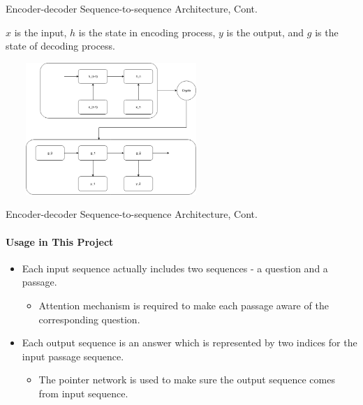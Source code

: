\documentclass{beamer}
\begin{document}
\begin{frame}{Encoder-decoder Sequence-to-sequence Architecture, Cont.}
\begin{examples}
$x$ is the input, $h$ is the state in encoding process, $y$ is the output, and $g$ is the state of decoding process.
\begin{center}
        \includegraphics[width=8cm, height=5cm]{figures/encoderDecoder.png}
    \end{center}
\end{examples}

\end{frame}

\begin{frame}{Encoder-decoder Sequence-to-sequence Architecture, Cont.}\framesubtitle{Usage in This Project}
    \begin{itemize}
        \item Each input sequence actually includes two sequences - a question and a passage.
            \begin{itemize}
                \item Attention mechanism is required to make each passage aware of the corresponding question.
            \end{itemize}
        \item Each output sequence is an answer which is represented by two indices for the input passage sequence.
            \begin{itemize}
                \item The pointer network is used to make sure the output sequence comes from input sequence.
            \end{itemize}
    \end{itemize}
\end{frame}
\end{document}
